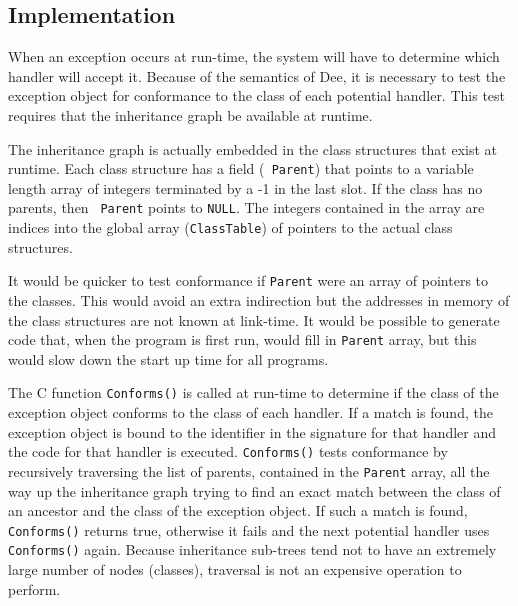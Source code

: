 \subsection{Implementation}

When an exception occurs at run-time, the system will have to
determine which handler will accept it.  Because of the semantics of
Dee, it is necessary to test the exception object for conformance to
the class of each potential handler.  This test requires that the
inheritance graph be available at runtime.

The inheritance graph is actually embedded in the class structures
that exist at runtime.  Each class structure has a field ({\tt
Parent}) that points to a variable length array of integers terminated
by a -1 in the last slot.  If the class has no parents, then {\tt
Parent} points to {\tt NULL}.  The integers contained in the array are
indices into the global array ({\tt ClassTable}) of pointers to the
actual class structures.



It would be quicker to test conformance if {\tt Parent} were an array
of pointers to the classes.  This would avoid an extra indirection but
the addresses in memory of the class structures are not known at
link-time. It would be possible to generate code that, when the
program is first run, would fill in {\tt Parent} array, but this would
slow down the start up time for all programs.  

The C function {\tt Conforms()} is called at run-time to determine if
the class of the exception object conforms to the class of each
handler.  If a match is found, the exception object is bound to the
identifier in the signature for that handler and the code for that
handler is executed.  {\tt Conforms()} tests conformance by recursively
traversing the list of parents, contained in the {\tt Parent} array,
all the way up the inheritance graph trying to find an exact match
between the class of an ancestor and the class of the exception
object.  If such a match is found, {\tt Conforms()} returns true,
otherwise it fails and the next potential handler uses {\tt
Conforms()} again.  Because inheritance sub-trees tend not to have an
extremely large number of nodes (classes), traversal is not an expensive
operation to perform.

